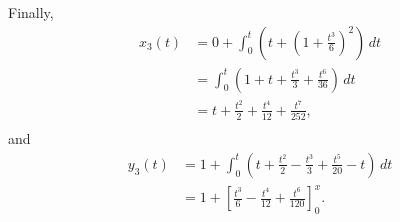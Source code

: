 \documentclass[../hw5]{subfiles}
\begin{document}
Finally,
\begin{align*}
    x_3(t)&=0+\int_{0}^{t}\left( t+{\left( 1+\frac{t^3}{6} \right)}^2 \right)\,dt \\
    &= \int_{0}^{t}\left( 1+t+\frac{t^3}{3}+\frac{t^6}{36} \right)\,dt \\
    &= t+\frac{t^2}{2}+\frac{t^4}{12}+\frac{t^7}{252}, \\
\end{align*}
and
\begin{align*}
    y_3(t)&=1+\int_{0}^{t}\left( t+\frac{t^2}{2}-\frac{t^3}{3}+\frac{t^5}{20}-t \right)\,dt \\
    &= 1+{\left[ \frac{t^3}{6}-\frac{t^4}{12}+\frac{t^6}{120} \right]}_0^x.
\end{align*}
\end{document}
